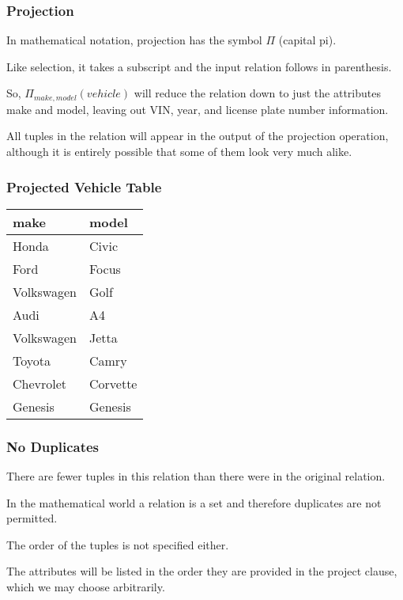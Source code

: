 \begin{frame}
\frametitle{Projection}

In mathematical notation, projection has the symbol $\Pi$ (capital pi). 

Like selection, it takes a subscript and the input relation follows in parenthesis. 

So, $\Pi_{make, model}( vehicle )$ will reduce the relation down to just the attributes make and model, leaving out VIN, year, and license plate number information.

All tuples in the relation will appear in the output of the projection operation, although it is entirely possible that some of them look very much alike. 

\end{frame}



\begin{frame}
\frametitle{Projected Vehicle Table}

\begin{center}
\begin{tabular}{|l|l|} \hline
\textbf{make} & \textbf{model} \\ \hline
	Honda & Civic \\ \hline
	Ford & Focus \\ \hline
	Volkswagen & Golf \\ \hline
	Audi & A4  \\ \hline
	Volkswagen & Jetta  \\ \hline
	Toyota & Camry \\ \hline
	Chevrolet & Corvette \\ \hline
	Genesis & Genesis \\ \hline
\end{tabular}
\end{center}

\end{frame}



\begin{frame}
\frametitle{No Duplicates}

There are fewer tuples in this relation than there were in the original relation. 

In the mathematical world a relation is a set and therefore duplicates are not permitted. 

The order of the tuples is not specified either. 

The attributes will be listed in the order they are provided in the project clause, which we may choose arbitrarily. 

\end{frame}




